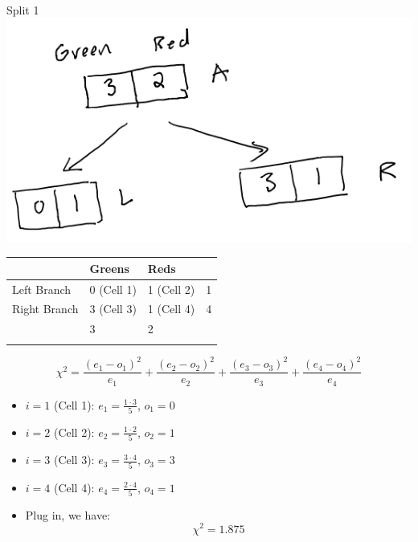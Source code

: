 \documentclass[
  ignorenonframetext,
]{beamer}
\begin{document}
\begin{frame}{Split 1}
\label{split-1}
\includegraphics{images/im1.png}

\begin{longtable}[]{@{}llll@{}}
\toprule\noalign{}
& Greens & Reds & \\
\midrule\noalign{}
\endhead
Left Branch & 0 (Cell 1) & 1 (Cell 2) & 1 \\
Right Branch & 3 (Cell 3) & 1 (Cell 4) & 4 \\
& 3 & 2 & \\
\bottomrule\noalign{}
\end{longtable}

\[\chi^2 = \frac{(e_1-o_1)^2}{e_1}+\frac{(e_2-o_2)^2}{e_2}+\frac{(e_3-o_3)^2}{e_3}+\frac{(e_4-o_4)^2}{e_4}\]

\begin{itemize}
\item
  \(i=1\) (Cell 1): \(e_1 = \frac{1\cdot 3}{5}\), \(o_1 = 0\)
\item
  \(i=2\) (Cell 2): \(e_2 = \frac{1\cdot 2}{5}\), \(o_2 = 1\)
\item
  \(i=3\) (Cell 3): \(e_3 = \frac{3\cdot 4}{5}\), \(o_3 = 3\)
\item
  \(i=4\) (Cell 4): \(e_4 = \frac{2\cdot 4}{5}\), \(o_4 = 1\)
\item
  Plug in, we have: \[\chi^2 = 1.875\]
\end{itemize}
\end{frame}
\end{document}
